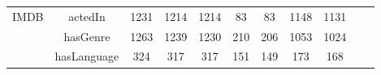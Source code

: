 \begin{tabular}{|c|c|c|c|c|c|c|c|c|c|c|}
  \\ \hline
\multirow{3}{*}{IMDB} &     actedIn       &    1231    &  1214 & 1214         &     83   &   83   &    1148           &    1131            &              &               \\ \cline{2-11}
  &     hasGenre       &    1263    &  1239 &  1230           &    210    &   206   &   1053            &    1024            &              &               \\ \cline{2-11}
 &     hasLanguage       &   324     & 317 &   317           &   151    &   149   &  173             &    168            &              &               \\ \cline{1-11}
\end{tabular}

